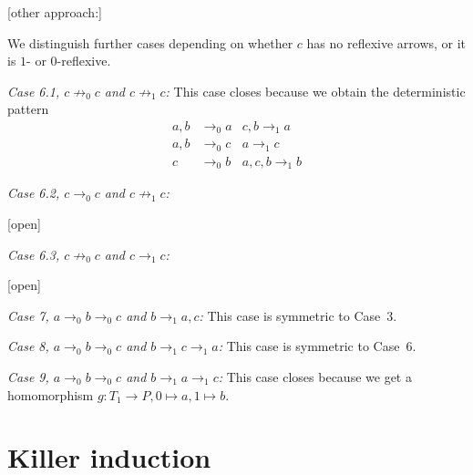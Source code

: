 \documentclass[a4paper]{article}
\newcommand{\case}[2]{\vspace{1ex}\noindent\textit{Case #1, #2:}}
\begin{document}
[other approach:]

We distinguish
further cases depending on whether $c$ has no reflexive arrows, or it
is $1$- or $0$-reflexive.

\case{6.1}{$c \not \rightarrow_0 c$ and $c \not \rightarrow_1 c$}
This case closes because we obtain the deterministic pattern
\begin{align*}
 a,b & \rightarrow_0 a & c,b \rightarrow_1 a \\
 a,b & \rightarrow_0 c & a \rightarrow_1 c \\
 c & \rightarrow_0 b & a,c,b \rightarrow_1 b
\end{align*}

\case{6.2}{$c \rightarrow_0 c$ and $c \not \rightarrow_1 c$}

[open]

\case{6.3}{$c \not \rightarrow_0 c$ and $c \rightarrow_1 c$}

[open]


\case{7}{$a \rightarrow_0 b \rightarrow_0 c$ and $b \rightarrow_1 a,c$}
This case is symmetric to Case~3.

\case{8}{$a \rightarrow_0 b \rightarrow_0 c$ and $b \rightarrow_1 c
\rightarrow_1 a$}
This case is symmetric to Case~6.

\case{9}{$a \rightarrow_0 b \rightarrow_0 c$ and $b \rightarrow_1 a
\rightarrow_1 c$} This case closes because we get a homomorphism $g :
T_1 \to P, 0 \mapsto a, 1 \mapsto b$.

\section{Killer induction}
\end{document}
